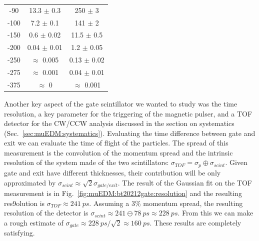 \begin{refsection}
\begin{table}[ht]
\begin{minipage}{0.4\textwidth}
\begin{tabular}{|c|c|c|}
                -90 & 13.3 $\pm$ 0.3 & 250 $\pm$ 3 \\
                -100 & 7.2 $\pm$ 0.1 & 141 $\pm$ 2 \\
                -150 & 0.6 $\pm$ 0.02 & 11.5 $\pm$ 0.5 \\
                -200 & 0.04 $\pm$ 0.01 & 1.2 $\pm$ 0.05 \\
                -250 & $\approx$ 0.005 & 0.13 $\pm$ 0.02 \\
                -275 & $\approx$ 0.001 & 0.04 $\pm$ 0.01 \\
                -375 & $\approx$ 0 & $\approx$ 0.001 \\
                \hline
                \end{tabular}
                \label{tab:muEDM:bt2022:gatenoise}
              \end{minipage}
            \end{table}

            \noindent
            Another key aspect of the gate scintillator we wanted to study was the time resolution, a key parameter for the triggering of the magnetic pulser, and a TOF detector for the CW/CCW analysis discussed in the section on systematics (Sec.~\ref{sec:muEDM:systematics}).
            Evaluating the time difference between gate and exit we can evaluate the time of flight of the particles. 
            The spread of this measurement is the convolution of the momentum spread and the intrinsic resolution of the system made of the two scintillators: $\sigma_{TOF} = \sigma_{p} \oplus \sigma_{scint}$.
            Given gate and exit have different thicknesses, their contribution will be only approximated by $\sigma_{scint}\approx\sqrt{2}\sigma_{gate/exit}$.
            The result of the Gaussian fit on the TOF measurement is in Fig.~\ref{fig:muEDM:bt20212gate:resolution} and the resulting res9olution is $\sigma_{TOF} \approx \SI{241}{ps}$.
            Assuming a 3\% momentum spread, the resulting resolution of the detector is $\sigma_{scint}\approx 241 \ominus \SI{78}{ps} \approx \SI{228}{ps}$.
            From this we can make a rough estimate of $\sigma_{gate}\approx\SI{228}{ps}/\sqrt{2} \approx\SI{160}{ps}$.
            These results are completely satisfying.


\end{refsection}
